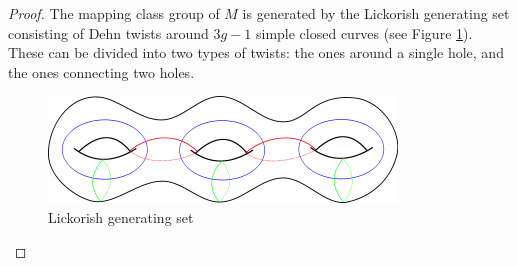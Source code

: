 \documentclass{amsart}
\begin{document}
\begin{proof}
The mapping class group of $M$ is generated by the Lickorish generating set consisting of Dehn twists around $3g-1$ simple closed curves (see Figure \ref{fig:lickorish}).  These can be divided into two types of twists: the ones around a single hole, and the ones connecting two holes.

\begin{figure}
\includegraphics[width=.80\textwidth]{lickorish.png}
\caption{Lickorish generating set}
\label{fig:lickorish}
\end{figure}

\newcommand{\nc}{\newcommand}


     \nc{\lcx}{-0.5}
     \nc{\lcy}{0.866}
     \nc{\rcx}{-\lcx}
     \nc{\rcy}{\lcy}

     \nc{\makeBdy}{
       \begin{scope}[very thick,decoration={
             markings,
             mark=at position 0.5 with {\arrow{>}}}
         ]  

         \draw[postaction={decorate}] (-1,0) -- (\lcx, \lcy); 
         \draw (\lcx, \lcy) -- (\rcx, \rcy); 
         \draw[postaction={decorate}]  (1, 0) -- (\rcx, \rcy);
       \end{scope}
     }

    \nc{\lcutx}{-0.6}
    \nc{\lcuty}{0.6928}
    \nc{\lcut}{(\lcutx, \lcuty)}
    \nc{\rcutx}{-\lcutx}
    \nc{\rcuty}{\lcuty}
    \nc{\rcut}{(\rcutx, \rcuty)}

    \nc{\mvx}{0}
    \nc{\mvy}{0.2}
    \nc{\mv}{(\mvx, \mvy)}

    \nc{\outEdge}{\draw[postaction={decorate}]  (0, 0) -- \mv node[pos=.5, right]{$hgh^{-1}$};}

    \nc{\mtopx}{0}
    \nc{\mtopy}{0.866}
    \nc{\mtop}{(\mtopx, \mtopy)}


\begin{figure}
    \centering
    \begin{tikzpicture}[scale=5]    


\end{tikzpicture}
\end{figure}
\end{proof}
\end{document}
